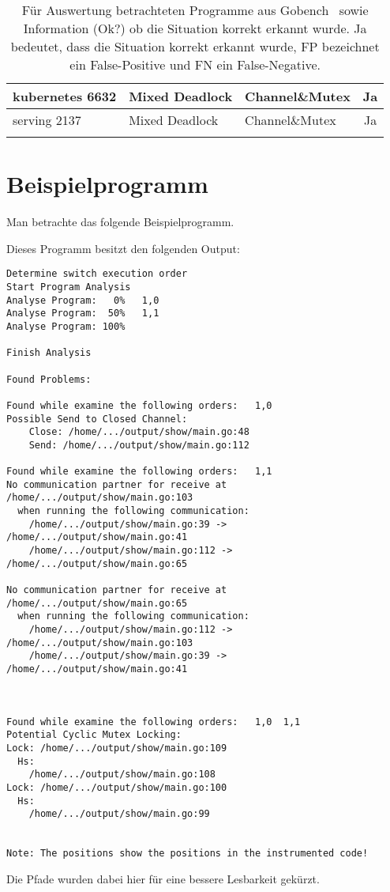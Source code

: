 \begin{longtable}[c]{|l|l|l|c|}
  kubernetes 6632      & Mixed Deadlock         & Channel\&Mutex         & Ja                                   \\ \hline
  serving 2137      & Mixed Deadlock         & Channel\&Mutex         & Ja                                   \\ \hline
  \caption{Für Auswertung betrachteten 
  Programme aus Gobench~\cite{gobench} sowie 
  Information (Ok?) ob die Situation korrekt erkannt wurde. Ja bedeutet, dass 
  die Situation korrekt erkannt wurde, FP bezeichnet ein False-Positive
  und FN ein False-Negative. }
  \label{App-Goker}
  \end{longtable}


\chapter{Beispielprogramm}\label{Appendix-2}
Man betrachte das folgende Beispielprogramm.
  
% 
% 

Dieses Programm besitzt den folgenden Output:
\begin{verbatim}
Determine switch execution order
Start Program Analysis
Analyse Program:   0%   1,0
Analyse Program:  50%   1,1
Analyse Program: 100%

Finish Analysis

Found Problems:

Found while examine the following orders:   1,0
Possible Send to Closed Channel:
    Close: /home/.../output/show/main.go:48
    Send: /home/.../output/show/main.go:112

Found while examine the following orders:   1,1
No communication partner for receive at /home/.../output/show/main.go:103 
  when running the following communication:
    /home/.../output/show/main.go:39 -> /home/.../output/show/main.go:41
    /home/.../output/show/main.go:112 -> /home/.../output/show/main.go:65

No communication partner for receive at /home/.../output/show/main.go:65 
  when running the following communication:
    /home/.../output/show/main.go:112 -> /home/.../output/show/main.go:103
    /home/.../output/show/main.go:39 -> /home/.../output/show/main.go:41



Found while examine the following orders:   1,0  1,1
Potential Cyclic Mutex Locking:
Lock: /home/.../output/show/main.go:109
  Hs:
    /home/.../output/show/main.go:108
Lock: /home/.../output/show/main.go:100
  Hs:
    /home/.../output/show/main.go:99


Note: The positions show the positions in the instrumented code!
\end{verbatim}
Die Pfade wurden dabei hier für eine bessere Lesbarkeit gekürzt. 
